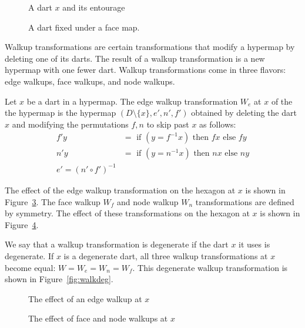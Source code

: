 \begin{figure}[htb]
  \centering
  \caption{A dart $x$ and its entourage}
  \label{fig:dart+}
\end{figure}

\begin{figure}[htb]
  \centering
  \caption{A dart fixed under a face map.}
  \label{fig:dart-fix}
\end{figure}

Walkup transformations are certain transformations that modify a
hypermap by deleting one of its darts.  The result of a walkup
transformation is a new hypermap with one fewer dart.  Walkup
transformations come in three flavors: edge walkups, face walkups,
and node walkups.

\begin{definition}
Let $x$ be a dart in a hypermap.  The edge walkup transformation
$W_e$ at $x$ of the the hypermap is the hypermap
$(D\setminus\{x\},e',n',f')$ obtained by deleting the dart $x$ and
modifying the permutations $f,n$ to skip past $x$ as follows:
    $$
    \begin{array}{lll}
    f' y &= \text{ if } (y = f^{-1} x) \text{ then } f x \text{ else
    } f y\\
    n' y &= \text{ if } (y = n^{-1} x) \text{ then } n x \text{ else
    } n y\\
    e' = (n'\circ f')^{-1}
    \end{array}
    $$
\end{definition}

The effect of the edge walkup transformation on the hexagon at $x$
is shown in Figure~\ref{fig:walk}.  The face walkup $W_f$ and node walkup
$W_n$ transformations are defined by symmetry.  The effect of these
transformations on the hexagon at $x$ is shown in Figure~\ref{fig:walkfn}.

We say that a walkup transformation is degenerate if the dart $x$ it
uses is degenerate.   If $x$ is a degenerate dart, all three walkup
transformations at $x$ become equal: $W=W_e=W_n=W_f$. This
degenerate walkup transformation is shown in Figure~\ref{fig:walkdeg}.

\begin{figure}[htb]
  \centering
  \caption{The effect of an edge walkup at $x$}
  \label{fig:walk}
\end{figure}

\begin{figure}[htb]
  \centering
  \caption{The effect of face and node walkups at $x$}
  \label{fig:walkfn}
\end{figure}


